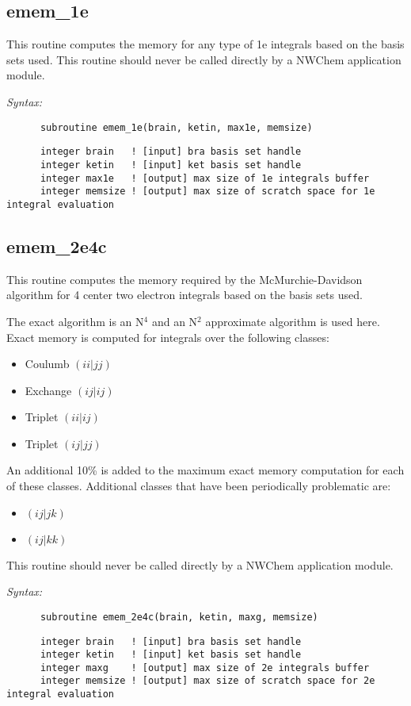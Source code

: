 \subsection{emem\_1e} 
This routine computes the memory for any type of 1e  
integrals based on the basis sets used.   
This routine should never be called directly by a  
NWChem application module. 
 
{\it Syntax:} 
\begin{verbatim} 
      subroutine emem_1e(brain, ketin, max1e, memsize) 
\end{verbatim} 
\begin{verbatim} 
      integer brain   ! [input] bra basis set handle 
      integer ketin   ! [input] ket basis set handle 
      integer max1e   ! [output] max size of 1e integrals buffer 
      integer memsize ! [output] max size of scratch space for 1e integral evaluation 
\end{verbatim} 
\subsection{emem\_2e4c} 
This routine computes the memory required by the McMurchie-Davidson  
algorithm for 4 center two electron integrals based on the  
basis sets used.   
 
The exact algorithm is an N$^4$ and an N$^2$ approximate algorithm  
is used here.  Exact memory is computed for integrals over the  
following classes: 
\begin{itemize} 
\item Coulumb $(ii|jj)$ 
\item Exchange $(ij|ij)$ 
\item Triplet $(ii|ij)$ 
\item Triplet $(ij|jj)$ 
\end{itemize} 
An additional 10\% is added to the maximum exact memory  
computation for each of these classes.  Additional classes that  
have been periodically problematic are: 
\begin{itemize} 
\item $(ij|jk)$ 
\item $(ij|kk)$ 
\end{itemize} 
This routine should never be called directly by a  
NWChem application module. 
 
{\it Syntax:} 
\begin{verbatim} 
      subroutine emem_2e4c(brain, ketin, maxg, memsize) 
\end{verbatim} 
\begin{verbatim} 
      integer brain   ! [input] bra basis set handle 
      integer ketin   ! [input] ket basis set handle 
      integer maxg    ! [output] max size of 2e integrals buffer 
      integer memsize ! [output] max size of scratch space for 2e integral evaluation 
\end{verbatim} 
